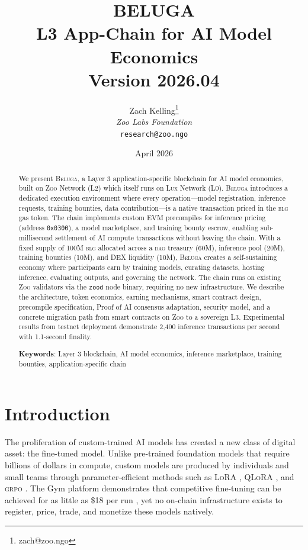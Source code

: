 \documentclass[11pt,letterpaper]{article}
\title{\textbf{BELUGA}\\
\large L3 App-Chain for AI Model Economics\\
\vspace{5pt}
\normalsize Version 2026.04}
\author{
Zach Kelling\thanks{zach@zoo.ngo}\\
\textit{Zoo Labs Foundation}\\
\texttt{research@zoo.ngo}
}
\date{April 2026}
\newcommand{\Zoo}{\textsc{Zoo}}
\newcommand{\Lux}{\textsc{Lux}}
\newcommand{\Beluga}{\textsc{Beluga}}
\newcommand{\BLG}{\textsc{blg}}
\newcommand{\DAO}{\textsc{dao}}
\newcommand{\LoRA}{\textsc{LoRA}}
\newcommand{\QLoRA}{\textsc{QLoRA}}
\newcommand{\GRPO}{\textsc{grpo}}
\begin{document}
\zoocoverpage

\begin{abstract}
We present \Beluga{}, a Layer 3 application-specific blockchain for AI model economics, built on \Zoo{} Network (L2) which itself runs on \Lux{} Network (L0). \Beluga{} introduces a dedicated execution environment where every operation---model registration, inference requests, training bounties, data contribution---is a native transaction priced in the \BLG{} gas token. The chain implements custom EVM precompiles for inference pricing (address \texttt{0x0300}), a model marketplace, and training bounty escrow, enabling sub-millisecond settlement of AI compute transactions without leaving the chain. With a fixed supply of 100M \BLG{} allocated across a \DAO{} treasury (60M), inference pool (20M), training bounties (10M), and DEX liquidity (10M), \Beluga{} creates a self-sustaining economy where participants earn by training models, curating datasets, hosting inference, evaluating outputs, and governing the network. The chain runs on existing \Zoo{} validators via the \texttt{zood} node binary, requiring no new infrastructure. We describe the architecture, token economics, earning mechanisms, smart contract design, precompile specification, Proof of AI consensus adaptation, security model, and a concrete migration path from smart contracts on \Zoo{} to a sovereign L3. Experimental results from testnet deployment demonstrate 2,400 inference transactions per second with 1.1-second finality.

\textbf{Keywords}: Layer 3 blockchain, AI model economics, inference marketplace, training bounties, application-specific chain
\end{abstract}

\tableofcontents
\newpage

\section{Introduction}

The proliferation of custom-trained AI models has created a new class of digital asset: the fine-tuned model. Unlike pre-trained foundation models that require billions of dollars in compute, custom models are produced by individuals and small teams through parameter-efficient methods such as \LoRA{} \cite{hu2021lora}, \QLoRA{} \cite{dettmers2023qlora}, and \GRPO{} \cite{shao2024deepseekmath}. The Gym platform demonstrates that competitive fine-tuning can be achieved for as little as \$18 per run \cite{zoo-gym}, yet no on-chain infrastructure exists to register, price, trade, and monetize these models natively.
\end{document}
